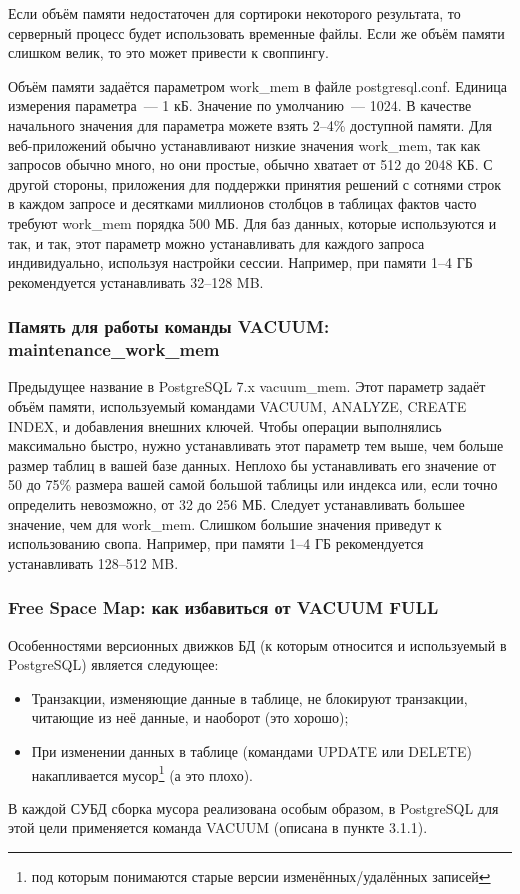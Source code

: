 Если объём памяти недостаточен для сортироки некоторого результата, то серверный процесс будет использовать 
временные файлы. Если же объём памяти слишком велик, то это может привести к своппингу.

Объём памяти задаётся параметром work\_mem в файле postgresql.conf. Единица измерения параметра~--- 1 кБ. 
Значение по умолчанию~--- 1024. В качестве начального значения для параметра можете взять 2--4\% доступной памяти.
Для веб-приложений обычно устанавливают низкие значения work\_mem, так как запросов обычно много, но они простые, обычно хватает 
от 512 до 2048 КБ. С другой стороны, приложения для поддержки принятия решений с сотнями строк в каждом запросе и десятками 
миллионов столбцов  в таблицах фактов часто требуют work\_mem порядка 500 МБ. Для баз данных, которые используются и так, и так, 
этот параметр можно устанавливать для каждого запроса индивидуально, используя настройки сессии. Например, 
при памяти 1--4 ГБ рекомендуется устанавливать 32--128 MB. 

\subsubsection{Память для работы команды VACUUM: maintenance\_work\_mem}
Предыдущее название в PostgreSQL 7.x vacuum\_mem. Этот параметр задаёт объём памяти, используемый командами 
VACUUM, ANALYZE, CREATE INDEX, и добавления внешних ключей. 
Чтобы операции выполнялись максимально быстро, нужно устанавливать этот параметр тем выше, чем больше размер таблиц в 
вашей базе данных. Неплохо бы устанавливать его значение от 50 до 75\% размера вашей самой большой таблицы или индекса или, 
если точно определить невозможно, от 32 до 256 МБ. Следует устанавливать большее значение, чем для work\_mem. 
Слишком большие значения приведут к использованию свопа. Например, при памяти 1--4 ГБ рекомендуется устанавливать 128--512 MB.

\subsubsection{Free Space Map: как избавиться от VACUUM FULL}
Особенностями версионных движков БД (к которым относится и используемый в PostgreSQL) является следующее:
\begin{itemize}
\item Транзакции, изменяющие данные в таблице, не блокируют транзакции, читающие из неё данные, и наоборот (это хорошо);
\item При изменении данных в таблице (командами UPDATE или DELETE) накапливается мусор\footnote{под которым понимаются 
старые версии изменённых/удалённых записей} (а это плохо).
\end{itemize}
В каждой СУБД сборка мусора реализована особым образом, в PostgreSQL для этой цели применяется команда VACUUM (описана в пункте 3.1.1).

